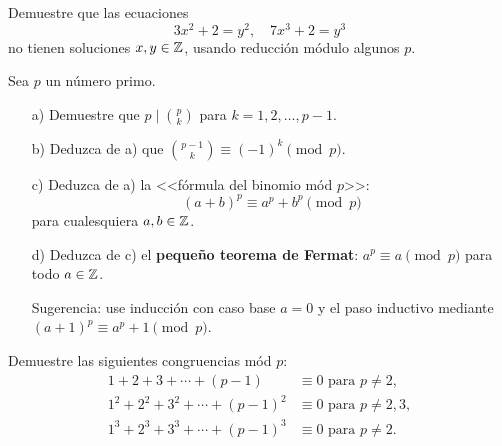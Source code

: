 \documentclass{article}
\begin{document}
\begin{problema}
  Demuestre que las ecuaciones
  $$3x^2 + 2 = y^2, \quad 7x^3 + 2 = y^3$$
  no tienen soluciones $x,y \in \mathbb{Z}$, usando reducción módulo algunos $p$.
\end{problema}

\begin{problema}
  \label{probl:pequeno-Fermat}
  Sea $p$ un número primo.

  \begin{enumerate}
  \item[a)] Demuestre que $p\mid {p\choose k}$ para $k = 1,2,\ldots,p-1$.

  \item[b)] Deduzca de a) que ${p-1\choose k} \equiv (-1)^k \pmod{p}$.

  \item[c)] Deduzca de a) la <<fórmula del binomio mód $p$>>:
    $$(a+b)^p \equiv a^p + b^p \pmod{p}$$
    para cualesquiera $a,b \in \mathbb{Z}$.

  \item[d)] Deduzca de c) el \textbf{pequeño teorema de Fermat}:
    $a^p \equiv a \pmod{p}$ para todo $a \in \mathbb{Z}$.

    Sugerencia: use inducción con caso base $a = 0$ y el paso inductivo mediante
    $(a+1)^p \equiv a^p + 1 \pmod{p}$.
  \end{enumerate}
\end{problema}

\begin{problema}
  Demuestre las siguientes congruencias mód $p$:
  \begin{align*}
    1 + 2 + 3 + \cdots + (p-1) & \equiv 0 \text{ para }p \ne 2,\\
    1^2 + 2^2 + 3^2 + \cdots + (p-1)^2 & \equiv 0 \text{ para }p \ne 2,3,\\
    1^3 + 2^3 + 3^3 + \cdots + (p-1)^3 & \equiv 0 \text{ para }p \ne 2.
  \end{align*}
\end{problema}
\end{document}
